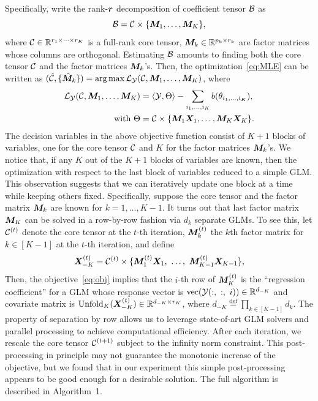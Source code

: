 \documentclass[twoside]{article}
\theoremstyle{plain}
\theoremstyle{definition}
\begin{document}
Specifically, write the rank-$\bm{r}$ decomposition of coefficient tensor $\mathcal{B}$ as
\begin{equation}\label{eq:tucker}
\mathcal{B}=\mathcal{C}\times \{\bm M_1,\ldots,\bm M_K\},
\end{equation}
where $\mathcal{C}\in\mathbb{R}^{r_1\times\cdots\times r_K}$ is a full-rank core tensor, $\bm M_k\in\mathbb{R}^{p_k\times r_k}$ are factor matrices whose columns are orthogonal. Estimating $\mathcal{B}$ amounts to finding both the core tensor $\mathcal{C}$ and the factor matrices $\bm M_k$'s. Then, the optimization~\eqref{eq:MLE} can be written as $(\hat {\mathcal{C}}, \{\hat {\bm M}_k\})=\arg\max \mathcal{L}_{\mathcal{Y}}(\mathcal{C}, \bm M_1,\ldots,\bm M_K)$, where
\begin{align}\label{eq:obj}
\mathcal{L}_{\mathcal{Y}}(\mathcal{C}, \bm M_1,\ldots,\bm M_K )&=\langle \mathcal{Y}, \Theta\rangle -\sum_{i_1,\ldots,i_K}b(\theta_{i_1,\ldots,i_K}),\\
\text{with } \Theta&=\mathcal{C}\times\{\bm M_1\bm X_1,\ldots,\bm M_K\bm X_K\}.
\end{align}
The decision variables in the above objective function consist of $K+1$ blocks of variables, one for the core tensor $\mathcal{C}$ and $K$ for the factor matrices $\bm M_k$'s. We notice that, if any $K$ out of the $K+1$ blocks of variables are known, then the optimization with respect to the last block of variables reduced to a simple GLM. This observation suggests that we can iteratively update one block at a time while keeping others fixed. Specifically, suppose the core tensor and the factor matrix $\bm M_k$ are known for $k=1,\ldots,K-1$. It turns out that last factor matrix $\bm M_K$ can be solved in a row-by-row fashion via $d_k$ separate GLMs. To see this, let $\mathcal{C}^{(t)}$ denote the core tensor at the $t$-th iteration,  $\bm M^{(t)}_k$ the $k$th factor matrix for $k\in[K-1]$ at the $t$-th iteration, and define
\[
\bm X^{(t)}_{-K}=\mathcal{C}^{(t)}\times \{ \bm M^{(t)}_1\bm X_1,\ \ldots,\ \bm M^{(t)}_{K-1}\bm X_{K-1}\},
\]
Then, the objective~\eqref{eq:obj} implies that the $i$-th row of $\bm M^{(t)}_K$ is the ``regression coefficient'' for a GLM whose response vector is $\text{vec}(\tY(:,\ :, \ i))\in\mathbb{R}^{d_{-K}}$ and covariate matrix is $\text{Unfold}_K(\bm X_{-K}^{(t)})\in\mathbb{R}^{d_{-K} \times r_K}$, where $d_{-K}\stackrel{\text{def}}{=}\prod_{k\in[K-1]}d_k$. The property of separation by row allows us to leverage state-of-art GLM solvers and parallel processing to achieve computational efficiency. After each iteration, we rescale the core tensor $\mathcal{C}^{(t+1)}$ subject to the infinity norm constraint. This post-processing in principle may not guarantee the monotonic increase of the objective, but we found that in our experiment this simple post-processing appears to be good enough for a desirable solution. The full algorithm is described in Algorithm~1.
\end{document}
